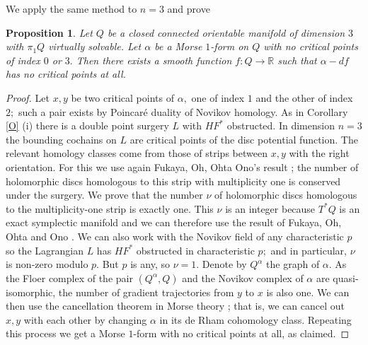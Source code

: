 \documentclass{article}
\theoremstyle{plain}%
\newtheorem{prop}[thm]{Proposition}
\theoremstyle{definition}
\numberwithin{equation}{section}
\numberwithin{figure}{section}
\def\l{\label}
\def\R{{\mathbin{\mathbb R}}}
\def\al{\alpha}
\begin{document}
We apply the same method to $n=3$ and prove 
\begin{prop}\l{prop: n=3}
Let $Q$ be a closed connected orientable manifold of dimension $3$ with $\pi_1Q$ virtually solvable. Let $\al$ be a Morse $1$-form on $Q$ with no critical points of index $0$ or $3.$ Then there exists a smooth function $f:Q\to\R$ such that $\al-df$ has no critical points at all.
\end{prop}
\begin{proof}
Let $x,y$ be two critical points of $\al,$ one of index $1$ and the other of index $2;$ such a pair exists by Poincar\'e duality of Novikov homology. As in Corollary \ref{O} (i) there is a double point surgery $L$ with $HF^*$ obstructed.
In dimension $n=3$ the bounding cochains on $L$ are critical points of the disc potential function. The relevant homology classes come from those of strips between $x,y$ with the right orientation.
For this we use again Fukaya, Oh, Ohta Ono's result \cite[Chapter 10]{FOOO}; the number of holomorphic discs homologous to this strip with multiplicity one is conserved under the surgery. 
We prove that the number $\nu$ of holomorphic discs homologous to the multiplicity-one strip is exactly one.
This $\nu$ is an integer because $T^*Q$ is an exact symplectic manifold and we can therefore use the result of Fukaya, Oh, Ohta and Ono \cite{FOOO-Z}.
We can also work with the Novikov field of any characteristic $p$ so the Lagrangian $L$ has $HF^*$ obstructed in characteristic $p;$ and in particular, $\nu$ is non-zero modulo $p.$  But $p$ is any, so $\nu=1.$
Denote by $Q^\al$ the graph of $\al.$
As the Floer complex of the pair $(Q^\al,Q)$ and the Novikov complex of $\al$ are quasi-isomorphic, the number of gradient trajectories from $y$ to $x$ is also one. 
We can then use the cancellation theorem in Morse theory \cite[Theorem 5.4]{Miln}; that is, we can cancel out $x,y$ with each other by changing $\al$ in its de Rham cohomology class.
Repeating this process we get a Morse $1$-form with no critical points at all, as claimed. 
\end{proof}
\end{document}
